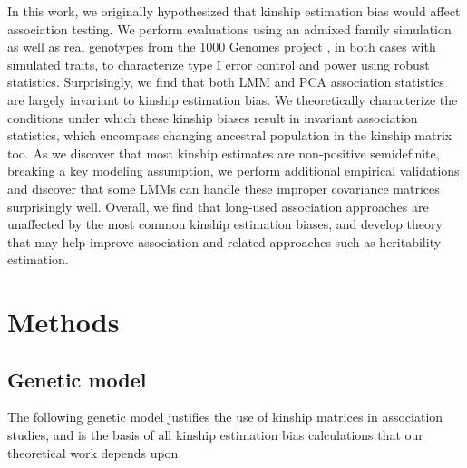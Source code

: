 \documentclass[11pt]{article}
\begin{document}
In this work, we originally hypothesized that kinship estimation bias would affect association testing.
We perform evaluations using an admixed family simulation \citep{yao_limitations_2022} as well as real genotypes from the 1000 Genomes project \citep{the_1000_genomes_project_consortium_map_2010, 1000_genomes_project_consortium_integrated_2012, fairley_international_2020}, in both cases with simulated traits, to characterize type I error control and power using robust statistics.
Surprisingly, we find that both LMM and PCA association statistics are largely invariant to kinship estimation bias.
We theoretically characterize the conditions under which these kinship biases result in invariant association statistics, which encompass changing ancestral population in the kinship matrix too.
As we discover that most kinship estimates are non-positive semidefinite, breaking a key modeling assumption, we perform additional empirical validations and discover that some LMMs can handle these improper covariance matrices surprisingly well.
Overall, we find that long-used association approaches are unaffected by the most common kinship estimation biases, and develop theory that may help improve association and related approaches such as heritability estimation.


\section{Methods}

\subsection{Genetic model}

The following genetic model justifies the use of kinship matrices in association studies, and is the basis of all kinship estimation bias calculations that our theoretical work depends upon.
\end{document}
